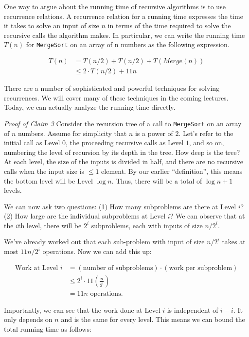 \documentclass [12pt]{article}
\begin{document}
One way to argue about the running time of recursive algorithms is to use recurrence relations. A recurrence relation for a running time expresses the time it takes to solve an input of size $n$ in terms of the time required to solve the recursive calls the algorithm makes. In particular, we can write the running time $T(n)$ for \texttt{MergeSort} on an array of n numbers as the following
expression.

\begin{align*}
T(n) &= T(n/2) + T(n/2) + T(Merge(n)) \\
&\leq 2\cdot T(n/2) + 11n
\end{align*}

There are a number of sophisticated and powerful techniques for solving recurrences. We will cover many of these techniques in the coming lectures. Today, we can actually analyze the running time directly.

\textit{Proof of Claim 3} Consider the recursion tree of a call to \texttt{MergeSort} on an array of $n$ numbers. Assume for simplicity that $n$ is a power of $2$. Let’s refer to the initial call as Level $0$, the proceeding recursive calls as Level $1$, and so on, numbering the level of recursion by its depth in the tree. How deep is the tree? At each level, the size of the inputs is divided in half, and there are no recursive calls when the input size is $\leq 1$ element. By our earlier ``definition'', this means the bottom level will be Level $\log n$. Thus, there will be a total of $\log n + 1$ levels.

We can now ask two questions: (1) How many subproblems are there at Level $i$? (2) How large are the individual subproblems at Level $i$? We can observe that at the $i$th level, there will be $2^i$ subproblems, each with inputs of size $n/2^i$.

We’ve already worked out that each sub-problem with input of size $n/2^
i$ takes at most $11n/2^i$ operations. Now we can add this up:

\begin{align*}
    \text{Work at Level }i &= (\text{number of subproblems}) \cdot (\text{work per subproblem}) \\
    &\leq 2^i \cdot 11 \left( \frac{n}{2^i} \right) \\
    &= 11n \text{ operations.}
\end{align*}

Importantly, we can see that the work done at Level $i$ is independent of $i - i$. It only depends on $n$ and is the same for every level. This means we can bound the total running time as follows:
\end{document}
